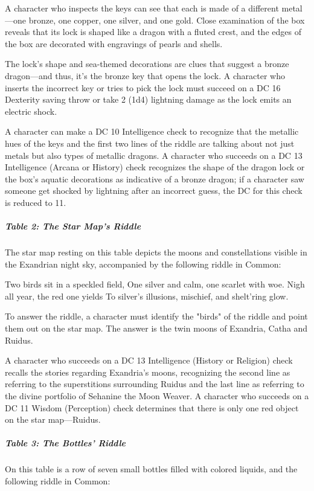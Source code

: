 \documentclass[10pt,a4paper,twoside,bg=print,twocolumn,openany,nodeprecatedcode]{dndbook}
\begin{document}
A character who inspects the keys can see that each is made of a different metal—one bronze, one copper, one silver, and one gold. Close examination of the box reveals that its lock is shaped like a dragon with a fluted crest, and the edges of the box are decorated with engravings of pearls and shells.

The lock's shape and sea-themed decorations are clues that suggest a bronze dragon—and thus, it's the bronze key that opens the lock. A character who inserts the incorrect key or tries to pick the lock must succeed on a DC 16 Dexterity saving throw or take 2 (1d4) lightning damage as the lock emits an electric shock.

A character can make a DC 10 Intelligence check to recognize that the metallic hues of the keys and the first two lines of the riddle are talking about not just metals but also types of metallic dragons. A character who succeeds on a DC 13 Intelligence (Arcana or History) check recognizes the shape of the dragon lock or the box's aquatic decorations as indicative of a bronze dragon; if a character saw someone get shocked by lightning after an incorrect guess, the DC for this check is reduced to 11.

\subparagraph{Table 2: The Star Map's Riddle}
The star map resting on this table depicts the moons and constellations visible in the Exandrian night sky, accompanied by the following riddle in Common:

\begin{DndReadAloud}{}
Two birds sit in a speckled field, One silver and calm, one scarlet with woe. Nigh all year, the red one yields To silver's illusions, mischief, and shelt'ring glow.

\end{DndReadAloud}

To answer the riddle, a character must identify the "birds" of the riddle and point them out on the star map. The answer is the twin moons of Exandria, Catha and Ruidus.

A character who succeeds on a DC 13 Intelligence (History or Religion) check recalls the stories regarding Exandria's moons, recognizing the second line as referring to the superstitions surrounding Ruidus and the last line as referring to the divine portfolio of Sehanine the Moon Weaver. A character who succeeds on a DC 11 Wisdom (Perception) check determines that there is only one red object on the star map—Ruidus.

\subparagraph{Table 3: The Bottles' Riddle}
On this table is a row of seven small bottles filled with colored liquids, and the following riddle in Common:
\end{document}
